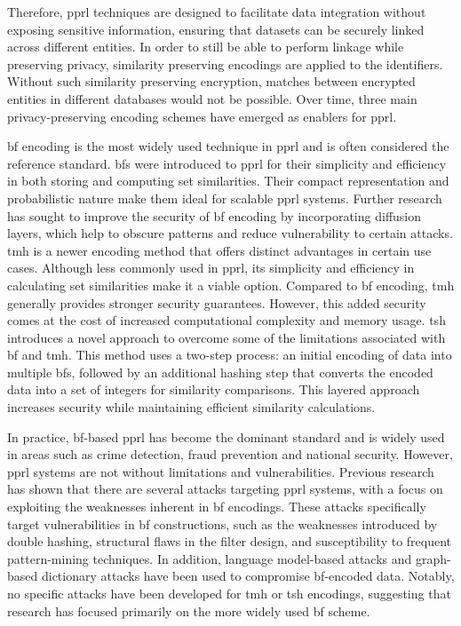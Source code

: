 Therefore, \ac{pprl} techniques are designed to facilitate data integration without exposing sensitive information, ensuring that datasets can be securely linked across different entities.
In order to still be able to perform linkage while preserving privacy, similarity preserving encodings are applied to the identifiers.
Without such similarity preserving encryption, matches between encrypted entities in different databases would not be possible.
Over time, three main privacy-preserving encoding schemes have emerged as enablers for \ac{pprl}. \cite{vidanage2020graph, schaefer2024}


\ac{bf} encoding is the most widely used technique in \ac{pprl} and is often considered the reference standard. 
\ac{bf}s were introduced to \ac{pprl} for their simplicity and efficiency in both storing and computing set similarities. 
Their compact representation and probabilistic nature make them ideal for scalable \ac{pprl} systems.
Further research has sought to improve the security of \ac{bf} encoding by incorporating diffusion layers, which help to obscure patterns and reduce vulnerability to certain attacks. %
\ac{tmh} is a newer encoding method that offers distinct advantages in certain use cases. 
Although less commonly used in \ac{pprl}, its simplicity and efficiency in calculating set similarities make it a viable option. 
Compared to \ac{bf} encoding, \ac{tmh} generally provides stronger security guarantees. 
However, this added security comes at the cost of increased computational complexity and memory usage.
\ac{tsh} introduces a novel approach to overcome some of the limitations associated with \ac{bf} and \ac{tmh}. 
This method uses a two-step process: an initial encoding of data into multiple \ac{bf}s, followed by an additional hashing step that converts the encoded data into a set of integers for similarity comparisons. 
This layered approach increases security while maintaining efficient similarity calculations. \cite{vidanage2020graph, schaefer2024}


In practice, \ac{bf}-based \ac{pprl} has become the dominant standard and is widely used in areas such as crime detection, fraud prevention and national security. 
However, \ac{pprl} systems are not without limitations and vulnerabilities. 
Previous research has shown that there are several attacks targeting \ac{pprl} systems, with a focus on exploiting the weaknesses inherent in \ac{bf} encodings.
These attacks specifically target vulnerabilities in \ac{bf} constructions, such as the weaknesses introduced by double hashing, structural flaws in the filter design, and susceptibility to frequent pattern-mining techniques. 
In addition, language model-based attacks and graph-based dictionary attacks have been used to compromise \ac{bf}-encoded data. 
Notably, no specific attacks have been developed for \ac{tmh} or \ac{tsh} encodings, suggesting that research has focused primarily on the more widely used \ac{bf} scheme. \cite{vidanage2020graph}


